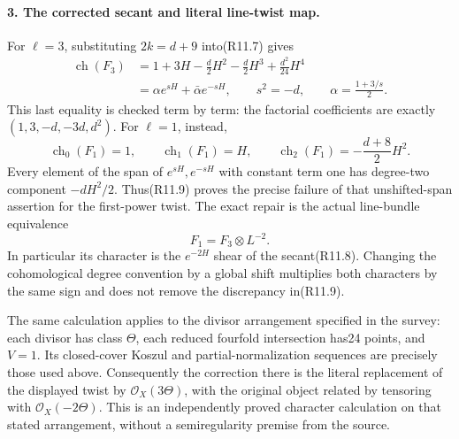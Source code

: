 \paragraph{3. The corrected secant and literal line-twist map.}
For $\ell=3$, substituting $2k=d+9$ into(R11.7) gives
\begin{equation}
\begin{aligned}
 \operatorname{ch}(F_3)
       &=1+3H-\frac d2H^2-\frac d2H^3+\frac{d^2}{24}H^4\\
       &=\alpha e^{sH}+\bar\alpha e^{-sH},
 \qquad s^2=-d,\qquad\alpha=\frac{1+3/s}{2}.
\end{aligned}                                                     \tag{R11.8}
\end{equation}
This last equality is checked term by term: the factorial
coefficients are exactly $(1,3,-d,-3d,d^2)$.
For $\ell=1$, instead,
\[
 \operatorname{ch}_0(F_1)=1,\qquad
 \operatorname{ch}_1(F_1)=H,\qquad
 \operatorname{ch}_2(F_1)=-\frac{d+8}{2}H^2.               \tag{R11.9}
\]
Every element of the span of $e^{sH},e^{-sH}$ with constant
term one has degree-two component $-dH^2/2$. Thus(R11.9)
proves the precise failure of that unshifted-span assertion
for the first-power twist. The exact repair is the actual
line-bundle equivalence
\[
                         F_1=F_3\otimes L^{-2}.              \tag{R11.10}
\]
In particular its character is the $e^{-2H}$ shear of the
secant(R11.8). Changing the cohomological degree convention
by a global shift multiplies both characters by the same sign
and does not remove the discrepancy in(R11.9).

The same calculation applies to the divisor arrangement specified
in the survey: each divisor has class $\Theta$, each reduced
fourfold intersection has24 points, and $V=1$. Its closed-cover
Koszul and partial-normalization sequences are precisely those
used above. Consequently the correction there is the literal
replacement of the displayed twist by $\mathcal O_X(3\Theta)$,
with the original object related by tensoring with
$\mathcal O_X(-2\Theta)$. This is an independently proved
character calculation on that stated arrangement, without a
semiregularity premise from the source.

